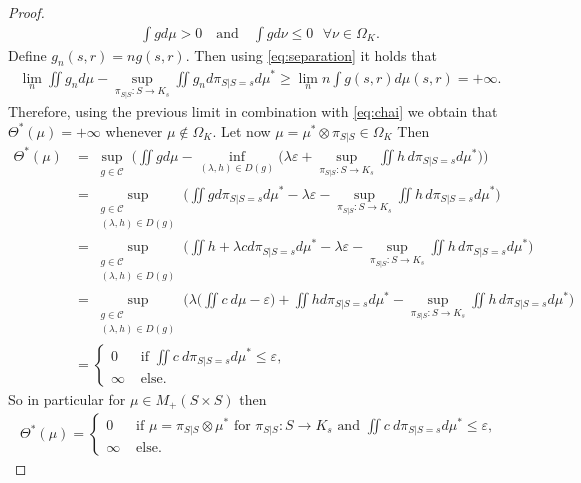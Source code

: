 \documentclass{article}
\theoremstyle{definition}
\theoremstyle{remarksty}
\begin{document}
\begin{proof}
\begin{align}\label{eq:separation}
    \int g d\mu > 0 \quad \text{and} \quad \int g   d\nu \leq 0 \ \ \ \forall \nu \in \Omega_K.
\end{align}
Define $g_n(s,r) = ng(s,r)$. Then using \eqref{eq:separation} it holds that 
\begin{align*}
   \lim_n \iint g_n d\mu - \sup_{\pi_{S|S} : S \rightarrow K_s} \iint g_n 
        d\pi_{S|S=s} d\mu^*  \geq \lim_n n\int g(s,r) d\mu(s,r)  = + \infty.
\end{align*}
Therefore, using the previous limit in combination with \eqref{eq:chai} we obtain that $\Theta^*(\mu) = +\infty$ whenever $\mu \notin \Omega_K$.
Let now $\mu = \mu^* \otimes \pi_{S|S} \in \Omega_K$ Then 
\begin{align*}
    \Theta^*(\mu) & = \sup_{\substack{g \in \mathcal{C}}} \bigg(\iint g d\mu - \inf_{(\lambda, h) \in D(g)} \bigg(\lambda\varepsilon + \sup_{\pi_{S|S} : S \rightarrow K_s} \iint h\, 
        d\pi_{S|S=s} d\mu^* \bigg)\bigg) \\
        & = \sup_{\substack{g \in \mathcal{C} \\ (\lambda,h) \in D(g)} } \bigg(\iint g d\pi_{S|S=s} d\mu^* -\lambda \varepsilon - \sup_{\pi_{S|S} : S \rightarrow K_s} \iint h\, 
        d\pi_{S|S=s} d\mu^* \bigg)\\
        & =  \sup_{\substack{g\in\mathcal{C} \\ (\lambda,h) \in D(g)} } \bigg(\iint h + \lambda c d\pi_{S|S=s} d\mu^* -\lambda \varepsilon - \sup_{\pi_{S|S} : S \rightarrow K_s} \iint h\, 
        d\pi_{S|S=s} d\mu^* \bigg)\\
        & =  \sup_{\substack{g \in \mathcal{C} \\ (\lambda,h) \in D(g)} } \bigg(\lambda \bigg( \iint c\ d\mu - \varepsilon \bigg) + \iint h d\pi_{S|S=s} d\mu^* - \sup_{\pi_{S|S} : S \rightarrow K_s} \iint h\, 
        d\pi_{S|S=s} d\mu^* \bigg)\\
        &= \begin{cases}
            0 &\text{ if } \displaystyle \iint c\ d\pi_{S|S=s} d\mu^* \leq \varepsilon,  \\
            \infty &\text{ else.}
        \end{cases}
\end{align*}
So in particular for $\mu \in M_+(S\times S)$ then 
\begin{align*}
    \Theta^*(\mu) = \begin{cases}
            0 &\text{ if } \mu = \pi_{S|S} \otimes \mu^* \text{ for }  \pi_{S|S} : S \rightarrow K_s \text{ and }  \displaystyle \iint c\ d\pi_{S|S=s} d\mu^* \leq \varepsilon,  \\
            \infty &\text{ else.}
        \end{cases}
\end{align*}


\end{proof}
\end{document}

